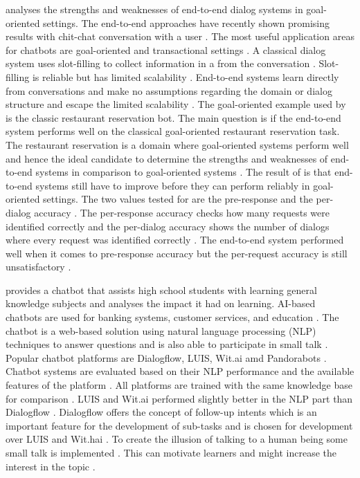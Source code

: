 \citet{bordes2016learning} analyses the strengths and weaknesses of end-to-end dialog systems in goal-oriented settings.
The end-to-end approaches have recently shown promising results with chit-chat conversation with a user \cite{bordes2016learning}.
The most useful application areas for chatbots are goal-oriented and transactional settings \cite{bordes2016learning}.
A classical dialog system uses slot-filling to collect information in a from the conversation \cite{bordes2016learning}.
Slot-filling is reliable but has limited scalability \cite{bordes2016learning}.
End-to-end systems learn directly from conversations and make no assumptions regarding the domain or dialog structure and 
escape the limited scalability \cite{bordes2016learning}. 
The goal-oriented example used by \citet{bordes2016learning} is the classic restaurant reservation bot.
The main question is if the end-to-end system performs well on the classical goal-oriented restaurant reservation task.
The restaurant reservation is a domain where goal-oriented systems perform well and hence the ideal candidate to determine
the strengths and weaknesses of end-to-end systems in comparison to goal-oriented systems \cite{bordes2016learning}.
The result of \citet{bordes2016learning} is that end-to-end systems still have to improve before they can perform 
reliably in goal-oriented settings. The two values tested for are the pre-response and the per-dialog accuracy \cite{bordes2016learning}.
The per-response accuracy checks how many requests were identified correctly and the per-dialog accuracy shows 
the number of dialogs where every request was identified correctly \cite{bordes2016learning}. 
The end-to-end system performed well when it comes to pre-response accuracy but the per-request accuracy
is still unsatisfactory \cite{bordes2016learning}.

\citet{dutta2017developing} provides a chatbot that assists high school students with learning general 
knowledge subjects and analyses the impact it had on learning.
AI-based chatbots are used for banking systems, customer services, and education \cite{dutta2017developing}.
The chatbot is a web-based solution using natural language processing (NLP) techniques to answer 
questions and is also able to participate in small talk \cite{dutta2017developing}.
Popular chatbot platforms are Dialogflow, LUIS, Wit.ai amd Pandorabots \cite{dutta2017developing}.
Chatbot systems are evaluated based on their NLP performance and the available features of the platform 
\cite{dutta2017developing}. All platforms are trained with the same knowledge base for comparison \cite{dutta2017developing}. 
LUIS and Wit.ai performed slightly better in the NLP part than Dialogflow \cite{dutta2017developing}.
Dialogflow offers the concept of follow-up intents which is an important feature for the development 
of sub-tasks and is chosen for development over LUIS and Wit.hai \cite{dutta2017developing}.
To create the illusion of talking to a human being some small talk is implemented \cite{dutta2017developing}. 
This can motivate learners and might increase the interest in the topic \cite{dutta2017developing}.

